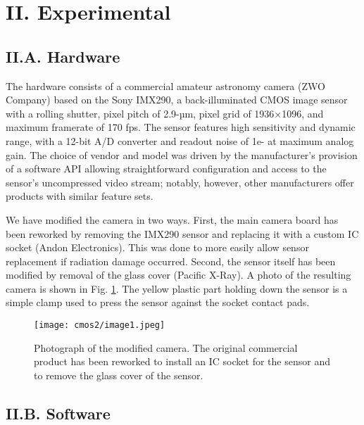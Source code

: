 \section{II. Experimental }

\subsection{II.A. Hardware}

The hardware consists of a commercial amateur astronomy camera (ZWO
Company) based on the Sony IMX290, a back-illuminated CMOS image sensor
with a rolling shutter, pixel pitch of 2.9-µm, pixel grid of 1936×1096,
and maximum framerate of 170 fps. The sensor features high sensitivity
and dynamic range, with a 12-bit A/D converter and readout noise of 1e-
at maximum analog gain. The choice of vendor and model was driven by the
manufacturer's provision of a software API allowing straightforward
configuration and access to the sensor's uncompressed video stream;
notably, however, other manufacturers offer products with similar
feature sets.

We have modified the camera in two ways. First, the main camera board
has been reworked by removing the IMX290 sensor and replacing it with a
custom IC socket (Andon Electronics). This was done to more easily allow
sensor replacement if radiation damage occurred. Second, the sensor
itself has been modified by removal of the glass cover (Pacific X-Ray).
A photo of the resulting camera is shown in Fig. \ref{cmos2_image1}. The yellow plastic
part holding down the sensor is a simple clamp used to press the sensor
against the socket contact pads.

\begin{figure}[h] \label{cmos2_image1}
\caption{ Photograph of the modified camera. The original commercial
product has been reworked to install an IC socket for the sensor and to
remove the glass cover of the sensor.}
\centering
\texttt{[image: cmos2/image1.jpeg]}
\end{figure}

\subsection{II.B. Software}

